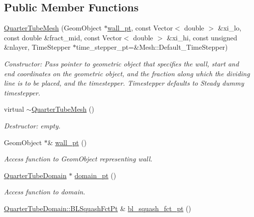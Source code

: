 \subsection*{Public Member Functions}
\begin{DoxyCompactItemize}
\item 
\hyperlink{classoomph_1_1QuarterTubeMesh_a4dfb9a85b3c07d8bafa0f916c445c18a}{Quarter\+Tube\+Mesh} (Geom\+Object $\ast$\hyperlink{classoomph_1_1QuarterTubeMesh_af59c4cde343ddd76caea4bc8c8ad8b94}{wall\+\_\+pt}, const Vector$<$ double $>$ \&xi\+\_\+lo, const double \&fract\+\_\+mid, const Vector$<$ double $>$ \&xi\+\_\+hi, const unsigned \&nlayer, Time\+Stepper $\ast$time\+\_\+stepper\+\_\+pt=\&Mesh\+::\+Default\+\_\+\+Time\+Stepper)
\begin{DoxyCompactList}\small\item\em Constructor\+: Pass pointer to geometric object that specifies the wall, start and end coordinates on the geometric object, and the fraction along which the dividing line is to be placed, and the timestepper. Timestepper defaults to Steady dummy timestepper. \end{DoxyCompactList}\item 
virtual \hyperlink{classoomph_1_1QuarterTubeMesh_aeb6ec7337a9e1666ebc6c942e788bab7}{$\sim$\+Quarter\+Tube\+Mesh} ()
\begin{DoxyCompactList}\small\item\em Destructor\+: empty. \end{DoxyCompactList}\item 
Geom\+Object $\ast$\& \hyperlink{classoomph_1_1QuarterTubeMesh_af59c4cde343ddd76caea4bc8c8ad8b94}{wall\+\_\+pt} ()
\begin{DoxyCompactList}\small\item\em Access function to Geom\+Object representing wall. \end{DoxyCompactList}\item 
\hyperlink{classoomph_1_1QuarterTubeDomain}{Quarter\+Tube\+Domain} $\ast$ \hyperlink{classoomph_1_1QuarterTubeMesh_a5629c3a0d3f8a60165fb7024b851e3e3}{domain\+\_\+pt} ()
\begin{DoxyCompactList}\small\item\em Access function to domain. \end{DoxyCompactList}\item 
\hyperlink{classoomph_1_1QuarterTubeDomain_a3d8c15c17d9912d8c519c028437c0b2c}{Quarter\+Tube\+Domain\+::\+B\+L\+Squash\+Fct\+Pt} \& \hyperlink{classoomph_1_1QuarterTubeMesh_afa145689b62afa7e66573c8c42bda8dd}{bl\+\_\+squash\+\_\+fct\+\_\+pt} ()

\end{DoxyCompactItemize}
